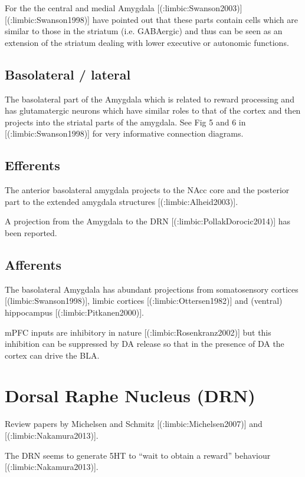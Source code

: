 For the  the central and medial Amygdala [(:limbic:Swanson2003)][(:limbic:Swanson1998)] have pointed out that these parts contain cells which are similar to those in the striatum (i.e. GABAergic) and thus can be seen as an extension of the striatum dealing with lower executive or autonomic functions.

\subsection{Basolateral / lateral}

The basolateral part of the Amygdala which is related to reward processing and has glutamatergic neurons which have similar roles to that of the cortex and then projects into the striatal parts of the amygdala. See Fig 5 and 6 in [(:limbic:Swanson1998)] for very informative connection diagrams.

\subsection{Efferents}

The anterior basolateral amygdala projects to the NAcc core and the  posterior part to the extended amygdala structures  [(:limbic:Alheid2003)].

A projection from the Amygdala to the DRN [(:limbic:PollakDorocic2014)] has been reported.

\subsection{Afferents}

The basolateral Amygdala has abundant projections from somatosensory cortices 
[(limbic:Swanson1998)], limbic cortices [(:limbic:Ottersen1982)] and (ventral) hippocampus [(:limbic:Pitkanen2000)].

mPFC inputs are inhibitory in nature [(:limbic:Rosenkranz2002)] but this inhibition can be suppressed by DA release so that in the presence of DA the cortex can drive the BLA.




\section{Dorsal Raphe Nucleus (DRN)}

Review papers by Michelsen and Schmitz [(:limbic:Michelsen2007)] and [(:limbic:Nakamura2013)].

The DRN seems to generate 5HT to “wait to obtain a reward” behaviour  [(:limbic:Nakamura2013)].

